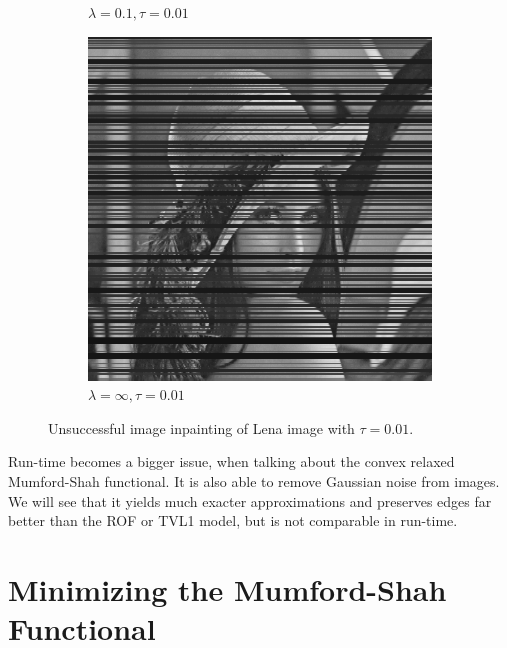 \documentclass[abstracton]{scrreprt}
\begin{document}
\begin{figure}[!ht]
\begin{subfigure}[b]{0.30\textwidth}
                    \caption{$\lambda = 0.1, \tau = 0.01$}
                \end{subfigure}
                \begin{subfigure}[b]{0.30\textwidth}
                    \includegraphics[width=\textwidth]{img/inpainting/001lena100.png}
                    \caption{$\lambda = \infty, \tau = 0.01$}
                \end{subfigure}
                \caption[Unsuccessful inpainting process with small $\tau$.]{Unsuccessful image inpainting of Lena image with $\tau = 0.01$.}
                \label{fig:unsuccessful_inpainting}
            \end{figure}
        Run-time becomes a bigger issue, when talking about the convex relaxed Mumford-Shah functional. It is also able to remove Gaussian noise from images. We will see that it yields much exacter approximations and preserves edges far better than the ROF or TVL1 model, but is not comparable in run-time.


    \section{Minimizing the Mumford-Shah Functional} %
    \label{sec:minimizing_the_mumford_shah_functional}
        
\end{document}
